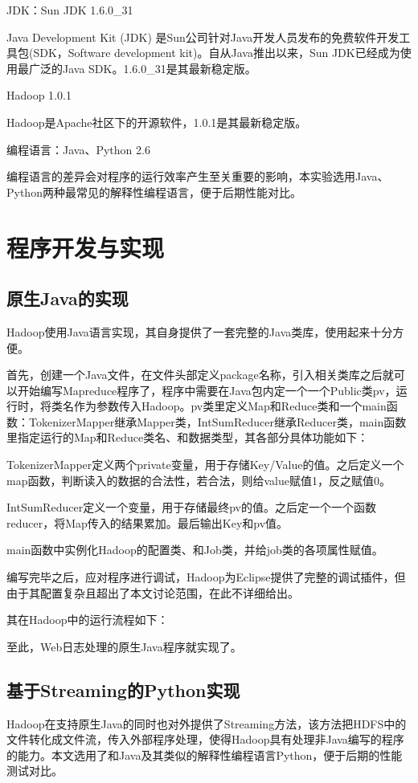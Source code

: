 JDK：Sun JDK 1.6.0\_31

Java Development Kit (JDK) 是Sun公司针对Java开发人员发布的免费软件开发工具包(SDK，Software development kit)。自从Java推出以来，Sun JDK已经成为使用最广泛的Java SDK。1.6.0\_31是其最新稳定版。

Hadoop 1.0.1

Hadoop是Apache社区下的开源软件，1.0.1是其最新稳定版。

编程语言：Java、Python 2.6

编程语言的差异会对程序的运行效率产生至关重要的影响，本实验选用Java、Python两种最常见的解释性编程语言，便于后期性能对比。


\section{程序开发与实现}
\subsection{原生Java的实现}
Hadoop使用Java语言实现，其自身提供了一套完整的Java类库，使用起来十分方便。

首先，创建一个Java文件，在文件头部定义package名称，引入相关类库之后就可以开始编写Mapreduce程序了，程序中需要在Java包内定一个一个Public类pv，运行时，将类名作为参数传入Hadoop。pv类里定义Map和Reduce类和一个main函数：TokenizerMapper继承Mapper类，IntSumReducer继承Reducer类，main函数里指定运行的Map和Reduce类名、和数据类型，其各部分具体功能如下：

TokenizerMapper定义两个private变量，用于存储Key/Value的值。之后定义一个map函数，判断读入的数据的合法性，若合法，则给value赋值1，反之赋值0。

IntSumReducer定义一个变量，用于存储最终pv的值。之后定一个一个函数reducer，将Map传入的结果累加。最后输出Key和pv值。

main函数中实例化Hadoop的配置类、和Job类，并给job类的各项属性赋值。

编写完毕之后，应对程序进行调试，Hadoop为Eclipse提供了完整的调试插件，但由于其配置复杂且超出了本文讨论范围，在此不详细给出。

其在Hadoop中的运行流程如下：

至此，Web日志处理的原生Java程序就实现了。

\subsection{基于Streaming的Python实现}
Hadoop在支持原生Java的同时也对外提供了Streaming方法，该方法把HDFS中的文件转化成文件流，传入外部程序处理，使得Hadoop具有处理非Java编写的程序的能力。本文选用了和Java及其类似的解释性编程语言Python，便于后期的性能测试对比。

